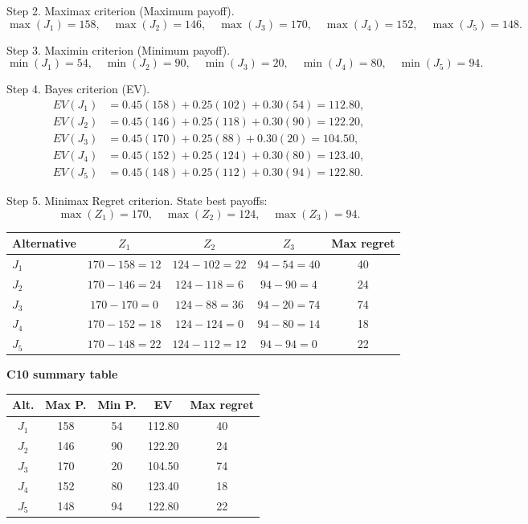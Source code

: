 \begin{ExamProblems}
		Step 2. Maximax criterion (Maximum payoff).
		\[
		\max(J_1)=158,\quad \max(J_2)=146,\quad \max(J_3)=170,\quad \max(J_4)=152,\quad \max(J_5)=148.
		\]

		Step 3. Maximin criterion (Minimum payoff).
		\[
		\min(J_1)=54,\quad \min(J_2)=90,\quad \min(J_3)=20,\quad \min(J_4)=80,\quad \min(J_5)=94.
		\]

		Step 4. Bayes criterion (EV).
		\[
		\begin{aligned}
		EV(J_1)&=0.45(158)+0.25(102)+0.30(54)=112.80,\\
		EV(J_2)&=0.45(146)+0.25(118)+0.30(90)=122.20,\\
		EV(J_3)&=0.45(170)+0.25(88)+0.30(20)=104.50,\\
		EV(J_4)&=0.45(152)+0.25(124)+0.30(80)=123.40,\\
		EV(J_5)&=0.45(148)+0.25(112)+0.30(94)=122.80.
		\end{aligned}
		\]

		Step 5. Minimax Regret criterion.
		State best payoffs:
		\[
		\max(Z_1)=170,\quad \max(Z_2)=124,\quad \max(Z_3)=94.
		\]
		\begin{center}
			\begin{tabular}{l c c c c}
				\toprule
				Alternative & $Z_1$ & $Z_2$ & $Z_3$ & Max regret \\
				\midrule
				$J_1$ & $170-158=12$ & $124-102=22$ & $94-54=40$ & 40 \\
				$J_2$ & $170-146=24$ & $124-118=6$ & $94-90=4$ & 24 \\
				$J_3$ & $170-170=0$ & $124-88=36$ & $94-20=74$ & 74 \\
				$J_4$ & $170-152=18$ & $124-124=0$ & $94-80=14$ & 18 \\
				$J_5$ & $170-148=22$ & $124-112=12$ & $94-94=0$ & 22 \\
				\bottomrule
			\end{tabular}
		\end{center}

		\textbf{C10 summary table}
		\begin{center}
			\begin{tabular}{c c c c c}
				\toprule
				Alt. & Max P. & Min P. & EV & Max regret \\
				\midrule
				$J_1$ & 158 & 54 & 112.80 & 40 \\
				$J_2$ & 146 & 90 & 122.20 & 24 \\
				$J_3$ & 170 & 20 & 104.50 & 74 \\
				$J_4$ & 152 & 80 & 123.40 & 18 \\
				$J_5$ & 148 & 94 & 122.80 & 22 \\
				\bottomrule
			\end{tabular}
		\end{center}


\end{ExamProblems}
